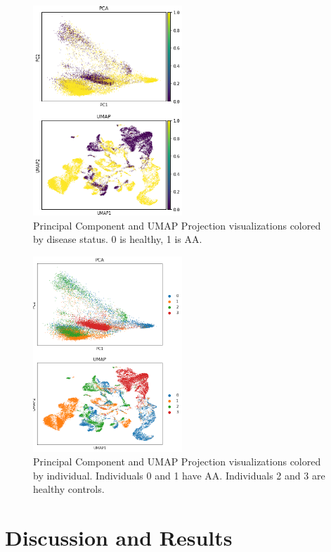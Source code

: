 \documentclass{article}
\begin{document}
\begin{figure}
  \centering
  \includegraphics[width=0.5\textwidth]{disease_status.png}
  \caption{Principal Component and UMAP Projection visualizations colored by disease status. 0 is healthy, 1 is AA.}
  \label{PCA_projections_disease}
\end{figure}

\begin{figure}
  \centering
  \includegraphics[width=0.5\textwidth]{individual.png}
  \caption{Principal Component and UMAP Projection visualizations colored by individual. Individuals 0 and 1 have AA. Individuals 2 and 3 are healthy controls.}
  \label{PCA_projections_individual}
\end{figure}


\section{Discussion and Results}
\end{document}
